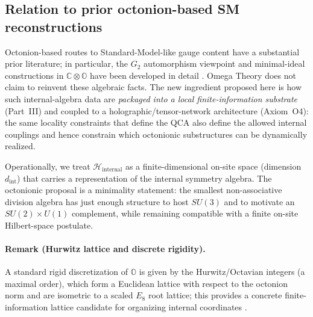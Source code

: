 \subsection{Relation to prior octonion-based SM reconstructions}
Octonion-based routes to Standard-Model-like gauge content have a substantial prior literature; in particular, the $G_2$ automorphism viewpoint and minimal-ideal constructions in $\mathbb{C}\otimes\mathbb{O}$ have been developed in detail \cite{Baez2002, Furey2017}. Omega Theory does not claim to reinvent these algebraic facts. The new ingredient proposed here is how such internal-algebra data are \emph{packaged into a local finite-information substrate} (Part~III) and coupled to a holographic/tensor-network architecture (Axiom~O4): the same locality constraints that define the QCA also define the allowed internal couplings and hence constrain which octonionic substructures can be dynamically realized.
\par
\noindent
Operationally, we treat $\mathcal{H}_{\text{internal}}$ as a finite-dimensional on-site space (dimension $d_{\text{int}}$) that carries a representation of the internal symmetry algebra. The octonionic proposal is a minimality statement: the smallest non-associative division algebra has just enough structure to host $SU(3)$ and to motivate an $SU(2)\times U(1)$ complement, while remaining compatible with a finite on-site Hilbert-space postulate.
\paragraph{Remark (Hurwitz lattice and discrete rigidity).}
A standard rigid discretization of $\mathbb{O}$ is given by the Hurwitz/Octavian integers (a maximal order), which form a Euclidean lattice with respect to the octonion norm and are isometric to a scaled $E_8$ root lattice; this provides a concrete finite-information lattice candidate for organizing internal coordinates \cite{Baez2002,ConwaySmith2003,Ma2025HPA}.

